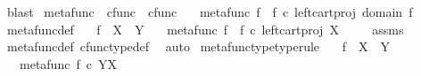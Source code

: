 \begin{isabellebody}
\ blast\isanewline
{}\isamarkupfalse%
%
\endisatagproof
{\isafoldproof}%
%
\isadelimproof
%
\endisadelimproof
%
\isadelimdocument
%
\endisadelimdocument
%
\isatagdocument
%
\isamarkuptrue%
%
\isamarkuptrue%
%
\endisatagdocument
{\isafolddocument}%
%
\isadelimdocument
%
\endisadelimdocument
{}\isamarkupfalse%
\ metafunc\ {\isacharcolon}{\kern0pt}{\isacharcolon}{\kern0pt}\ {\isachardoublequoteopen}cfunc\ {\isasymRightarrow}\ cfunc{\isachardoublequoteclose}\ \isanewline
\ \ {\isachardoublequoteopen}metafunc\ f\ {\isasymequiv}\ {\isacharparenleft}{\kern0pt}f\ {\isasymcirc}\isactrlsub c\ {\isacharparenleft}{\kern0pt}left{\isacharunderscore}{\kern0pt}cart{\isacharunderscore}{\kern0pt}proj\ {\isacharparenleft}{\kern0pt}domain\ f{\isacharparenright}{\kern0pt}\ {\isasymone}{\isacharparenright}{\kern0pt}{\isacharparenright}{\kern0pt}\isactrlsup {\isasymsharp}{\isachardoublequoteclose}\isanewline
\isanewline
{}\isamarkupfalse%
\ metafunc{\isacharunderscore}{\kern0pt}def{}{\isacharcolon}{\kern0pt}\isanewline
\ \ \ {\isachardoublequoteopen}f\ {\isacharcolon}{\kern0pt}\ X\ {\isasymrightarrow}\ Y{\isachardoublequoteclose}\isanewline
\ \ \ {\isachardoublequoteopen}metafunc\ f\ {\isacharequal}{\kern0pt}\ {\isacharparenleft}{\kern0pt}f\ {\isasymcirc}\isactrlsub c\ {\isacharparenleft}{\kern0pt}left{\isacharunderscore}{\kern0pt}cart{\isacharunderscore}{\kern0pt}proj\ X\ {\isasymone}{\isacharparenright}{\kern0pt}{\isacharparenright}{\kern0pt}\isactrlsup {\isasymsharp}{\isachardoublequoteclose}\isanewline
%
\isadelimproof
\ \ %
\endisadelimproof
%
\isatagproof
{}\isamarkupfalse%
\ assms\ \isamarkupfalse%
\ metafunc{\isacharunderscore}{\kern0pt}def\ cfunc{\isacharunderscore}{\kern0pt}type{\isacharunderscore}{\kern0pt}def\ \isamarkupfalse%
\ auto%
\endisatagproof
{\isafoldproof}%
%
\isadelimproof
\isanewline
%
\endisadelimproof
\isanewline
{}\isamarkupfalse%
\ metafunc{\isacharunderscore}{\kern0pt}type{\isacharbrackleft}{\kern0pt}type{\isacharunderscore}{\kern0pt}rule{\isacharbrackright}{\kern0pt}{\isacharcolon}{\kern0pt}\isanewline
\ \ \ {\isachardoublequoteopen}f\ {\isacharcolon}{\kern0pt}\ X\ {\isasymrightarrow}\ Y{\isachardoublequoteclose}\isanewline
\ \ \ {\isachardoublequoteopen}metafunc\ f\ {\isasymin}\isactrlsub c\ Y\isactrlbsup X\isactrlesup {\isachardoublequoteclose}\isanewline

\end{isabellebody}
